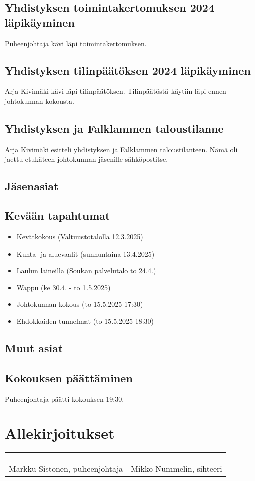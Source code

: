 \documentclass[a4paper,12pt]{article}
\begin{document}
\subsection{Yhdistyksen toimintakertomuksen 2024 läpikäyminen}
Puheenjohtaja kävi läpi toimintakertomuksen.
\subsection{Yhdistyksen tilinpäätöksen 2024 läpikäyminen}
Arja Kivimäki kävi läpi tilinpäätöksen. Tilinpäätöstä käytiin läpi ennen johtokunnan kokousta.
\subsection{Yhdistyksen ja Falklammen taloustilanne}
Arja Kivimäki esitteli yhdistyksen ja Falklammen taloustilanteen. Nämä oli jaettu etukäteen johtokunnan jäsenille sähköpostitse.
\subsection{Jäsenasiat}
\subsection{Kevään tapahtumat}
\begin{itemize}
\item{Kevätkokous} (Valtuustotalolla 12.3.2025)
\item{Kunta- ja aluevaalit} (sunnuntaina 13.4.2025)
\item{Laulun laineilla} (Soukan palvelutalo to 24.4.)
\item{Wappu} (ke 30.4. - to 1.5.2025)
\item{Johtokunnan kokous} (to 15.5.2025 17:30)
\item{Ehdokkaiden tunnelmat} (to 15.5.2025 18:30)
\end{itemize}
\subsection{Muut asiat}
\subsection{Kokouksen päättäminen}
Puheenjohtaja päätti kokouksen 19:30.
\section*{Allekirjoitukset}
\begin{flushleft}
\begin{tabular}{ll}
& \\
& \\
& \\
Markku Sistonen, puheenjohtaja &
Mikko Nummelin, sihteeri
\end{tabular}
\end{flushleft}
\end{document}

